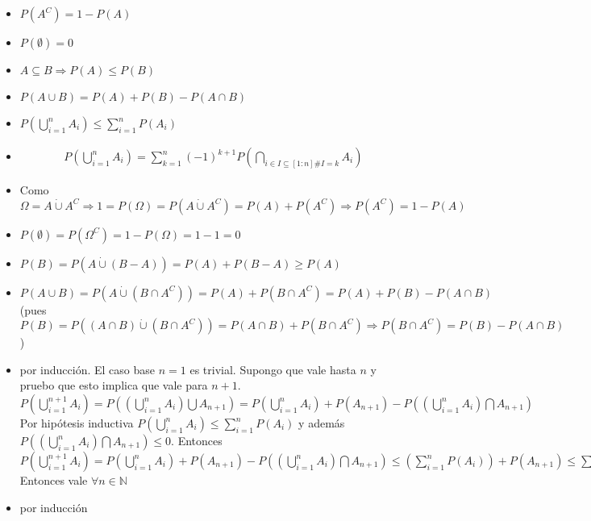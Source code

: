 \documentclass[a4paper,10pt]{article}
\begin{document}
\propiedades
\begin{itemize}
 \item $P(A^C) = 1-P(A)$ 
 \item $P(\emptyset) = 0$
 \item $A \subseteq B \Rightarrow P(A) \leq P(B)$
 \item $P(A \cup B) = P(A)+P(B)-P(A \cap B)$
 \item $P(\bigcup_{i=1}^{n} {A_i}) \leq \sum_{i=1}^{n} {P(A_i)}$
 \item \begin{equation} 	
   	\begin{split}
   	P \left( \bigcup_{i=1}^{n} {A_i} \right) = 
  		  \sum_{k=1}^{n} { { \left( -1 \right) }^{k+1} P \left( 	\bigcap_{i \in I \subseteq \left[ 1:n \right] \# I = k } {A_i} \right) }
   \end{split}
	\end{equation}
\end{itemize}
\ifversionlarga
\begin{demo}
	\begin{itemize}
		\item Como $\displaystyle\Omega = A \dot\cup {A^{C}} \Rightarrow 1=P(\Omega)=P(A \dot\cup {A^{C}})=P(A)+P(A^{C}) \Rightarrow P(A^C) = 1-P(A)$ 
		\item $P(\emptyset)=P(\Omega^{C})=1-P(\Omega)=1-1=0$
		\item $P(B)=P(A \dot\cup (B-A))=P(A)+P(B-A) \geq P(A)$ 
		\item $P(A \cup B) = P(A \dot\cup (B \cap A^{C})) = P(A) + P(B \cap A^{C}) = P(A) + P(B) - P(A \cap B)$\\ (pues $P(B) = P((A \cap B) \dot\cup (B \cap A^{C})) = P(A \cap B) + P(B \cap A^{C}) \Rightarrow P(B \cap A^{C}) = P(B) - P(A \cap B)$)
		\item por inducción. El caso base $n=1$ es trivial. Supongo que vale hasta $n$ y pruebo que esto implica que vale para $n+1$. \\
		$\displaystyle P\left(\bigcup_{i=1}^{n+1} {A_i}\right)=P\left(\left(\bigcup_{i=1}^{n} {A_i} \right) \bigcup A_{n+1}\right) = P\left(\bigcup_{i=1}^{n} {A_i} \right)+P\left(A_{n+1}\right)-P\left(\left(\bigcup_{i=1}^{n} {A_i} \right) \bigcap A_{n+1}\right) $ \\
		Por hipótesis inductiva $P\left(\bigcup_{i=1}^{n} {A_i}\right) \leq \sum_{i=1}^{n} {P(A_i)}$ y además $P\left(\left(\bigcup_{i=1}^{n} {A_i} \right) \bigcap A_{n+1}\right) \leq 0$. Entonces \\
		$\displaystyle P\left(\bigcup_{i=1}^{n+1} {A_i}\right) = P\left(\bigcup_{i=1}^{n} {A_i} \right)+P\left(A_{n+1}\right)-P\left(\left(\bigcup_{i=1}^{n} {A_i} \right) \bigcap A_{n+1}\right) \leq \left(\sum_{i=1}^{n} {P(A_i)}\right) + P\left(A_{n+1}\right) \leq \sum_{i=1}^{n+1} {P(A_i)}$ \\
		Entonces vale $\forall n \in \mathbb{N}$
		\item por inducción
	\end{itemize}
\end{demo} 
\else
\fi
\end{document}
